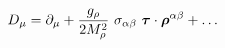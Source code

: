 \begin{equation}
D_\mu= \partial_\mu + \frac{g_\rho}{2M_\rho^2}~\sigma_{\alpha\beta} ~\mbox{\boldmath$\tau$} \cdot \mbox{\boldmath$\rho$}^{\alpha\beta}+\ldots 
\end{equation}

